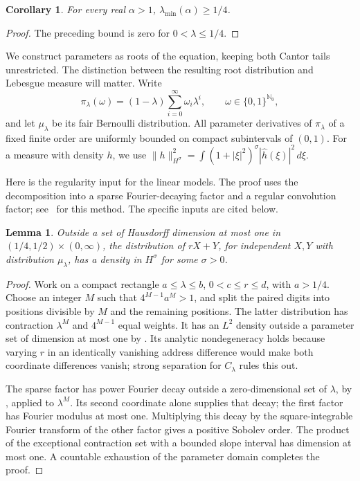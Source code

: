 \documentclass[11pt,a4paper]{amsart}
\numberwithin{equation}{section}
\newtheorem{lemma}[theorem]{Lemma}
\newtheorem{corollary}[theorem]{Corollary}
\theoremstyle{definition}
\begin{document}
\begin{corollary}\label{cor:first-lower}
For every real \(\alpha>1\), \(\lambda_{\min}(\alpha)\geq1/4\).
\end{corollary}
\begin{proof}
The preceding bound is zero for \(0<\lambda\leq1/4\).
\end{proof}



We construct parameters as roots of the equation, keeping both
Cantor tails unrestricted. The distinction between the resulting
root distribution and Lebesgue measure will matter.
Write
\[
\pi_\lambda(\omega)=(1-\lambda)\sum_{i=0}^\infty\omega_i\lambda^i,
\qquad \omega\in\{0,1\}^{\mathbb N_0},
\]
and let \(\mu_\lambda\) be its fair Bernoulli distribution.
All parameter derivatives of \(\pi_\lambda\) of a fixed finite
order are uniformly bounded on compact subintervals of \((0,1)\).
For a measure with density \(h\), we use
\(\|h\|_{H^\sigma}^2=\int(1+|\xi|^2)^\sigma|\widehat h(\xi)|^2\,d\xi\).

Here is the regularity input for the linear models. The proof uses
the decomposition into a sparse Fourier-decaying factor and a regular
convolution factor; see~\cite{Shmerkin2014,ShmerkinSolomyak2016}
for this method. The specific inputs are cited below.

\begin{lemma}\label{lem:linear-regularity}
Outside a set of Hausdorff dimension at most one in
\((1/4,1/2)\times(0,\infty)\), the distribution of
\(rX+Y\), for independent \(X,Y\) with distribution \(\mu_\lambda\),
has a density in \(H^\sigma\) for some \(\sigma>0\).
\end{lemma}
\begin{proof}
Work on a compact rectangle \(a\leq\lambda\leq b\),
\(0<c\leq r\leq d\), with \(a>1/4\). Choose an integer \(M\)
such that \(4^{M-1}a^M>1\), and split the paired digits into
positions divisible by \(M\) and the remaining positions.
The latter distribution has contraction \(\lambda^M\) and
\(4^{M-1}\) equal weights. It has an \(L^2\) density outside a
parameter set of dimension at most one by
\cite[Theorem~9.2]{Shmerkin2019}. Its analytic nondegeneracy
holds because varying \(r\) in an identically vanishing address
difference would make both coordinate differences vanish;
strong separation for \(C_\lambda\) rules this out.

The sparse factor has power Fourier decay outside a
zero-dimensional set of \(\lambda\), by
\cite[Proposition~2.3]{Shmerkin2014}, applied to \(\lambda^M\).
Its second coordinate alone supplies that decay; the first factor
has Fourier modulus at most one. Multiplying this decay by the
square-integrable Fourier transform of the other factor gives a
positive Sobolev order. The product of the exceptional contraction
set with a bounded slope interval has dimension at most one.
A countable exhaustion of the parameter domain completes the proof.
\end{proof}
\end{document}
